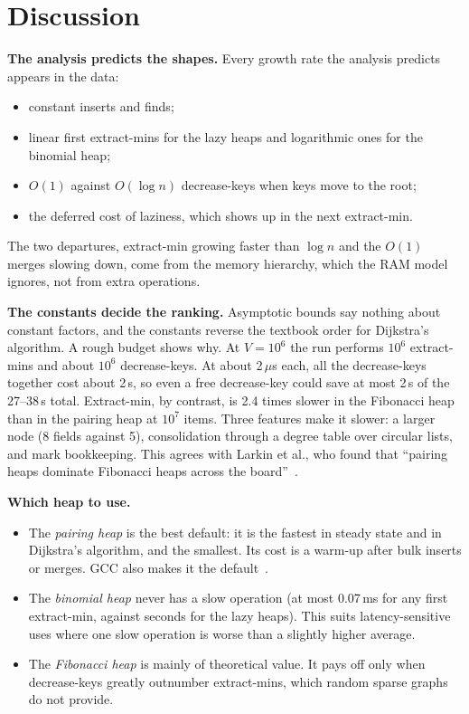 \documentclass[acmsmall,nonacm]{acmart}
\newcommand{\us}{\,$\mu$s}
\begin{document}
\section{Discussion}
\label{sec:discussion}

\textbf{The analysis predicts the shapes.} Every growth rate the analysis
predicts appears in the data:
\begin{itemize}
  \item constant inserts and finds;
  \item linear first extract-mins for the lazy heaps and logarithmic ones for the binomial heap;
  \item $O(1)$ against $O(\log n)$ decrease-keys when keys move to the root;
  \item the deferred cost of laziness, which shows up in the next extract-min.
\end{itemize}
The two departures, extract-min growing faster than $\log n$ and the
$O(1)$ merges slowing down, come from the memory hierarchy, which the RAM
model ignores, not from extra operations.

\textbf{The constants decide the ranking.} Asymptotic bounds say nothing about
constant factors, and the constants reverse the textbook order for Dijkstra's
algorithm. A rough budget shows why. At $V = 10^6$ the run performs $10^6$
extract-mins and about $10^6$ decrease-keys. At about 2\us{} each, all the
decrease-keys together cost about 2\,s, so even a free decrease-key could save
at most 2\,s of the 27--38\,s total. Extract-min, by contrast, is 2.4 times
slower in the Fibonacci heap than in the pairing heap at $10^7$ items. Three
features make it slower: a larger node (8 fields against 5), consolidation
through a degree table over circular lists, and mark bookkeeping. This agrees
with Larkin et al., who found that ``pairing heaps dominate Fibonacci heaps
across the board''~\cite{larkin2014}.

\textbf{Which heap to use.}
\begin{itemize}
  \item The \emph{pairing heap} is the best default: it is the fastest in steady state and in Dijkstra's algorithm, and the smallest. Its cost is a warm-up after bulk inserts or merges. GCC also makes it the default~\cite{gccpbds}.
  \item The \emph{binomial heap} never has a slow operation (at most 0.07\,ms for any first extract-min, against seconds for the lazy heaps). This suits latency-sensitive uses where one slow operation is worse than a slightly higher average.
  \item The \emph{Fibonacci heap} is mainly of theoretical value. It pays off only when decrease-keys greatly outnumber extract-mins, which random sparse graphs do not provide.
\end{itemize}
\end{document}
